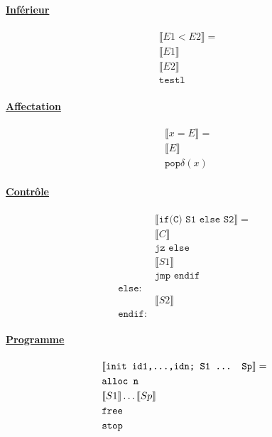 \documentclass[12pt,twocolumn]{report}
\begin{document}
\begin{trad}
    \paragraph*{ \underline{Inférieur}}
    \begin{align*}
        &\llbracket E1<E2 \rrbracket = \\
        &\llbracket E1 \rrbracket\\
        &\llbracket E2 \rrbracket\\
        &\texttt{testl}
    \end{align*}
\end{trad}
\begin{trad}
    \paragraph*{ \underline{Affectation}}
    \begin{align*}
        &\llbracket x=E \rrbracket = \\
        &\llbracket E \rrbracket\\
        &\texttt{pop} \delta(x)
    \end{align*}
\end{trad}
\begin{trad}
    \paragraph*{ \underline{Contrôle}}
    \begin{align*}
        &\llbracket \texttt{if(C) S1 else S2} \rrbracket = \\
        &\llbracket C \rrbracket\\
        &\texttt{jz else}\\
        &\llbracket S1 \rrbracket\\
        &\texttt{jmp endif}\\
        \texttt{else:}&\\
        &\llbracket S2 \rrbracket\\
        \texttt{endif:}
    \end{align*}
\end{trad}
\begin{trad}
    \paragraph*{ \underline{Programme}}
    \begin{align*}
        &\llbracket \texttt{init id1,\dots,idn; S1 ... Sp} \rrbracket = \\
        &\texttt{alloc n}\\
        &\llbracket S1 \rrbracket \dots \llbracket Sp \rrbracket\\
        &\texttt{free}\\
        &\texttt{stop}
    \end{align*}
\end{trad}
\end{document}
